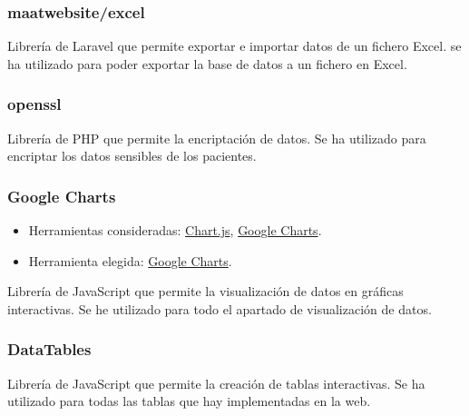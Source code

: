 \subsubsection{maatwebsite/excel}

Librería de Laravel que permite exportar e importar datos de un fichero Excel. se ha utilizado para poder exportar la base de datos a un fichero en Excel.

\subsubsection{openssl} \label{openssl}

Librería de PHP que permite la encriptación de datos. Se ha utilizado para encriptar los datos sensibles de los pacientes.

\subsubsection{Google Charts}
\begin{itemize}
    \item Herramientas consideradas: \href{https://www.chartjs.org/}{Chart.js}, \href{https://developers.google.com/chart}{Google Charts}.
	\item Herramienta elegida: \href{https://developers.google.com/chart}{Google Charts}.
\end{itemize}

Librería de JavaScript que permite la visualización de datos en gráficas interactivas. Se he utilizado para todo el apartado de visualización de datos.

\subsubsection{DataTables}

Librería de JavaScript que permite la creación de tablas interactivas. Se ha utilizado para todas las tablas que hay implementadas en la web.





